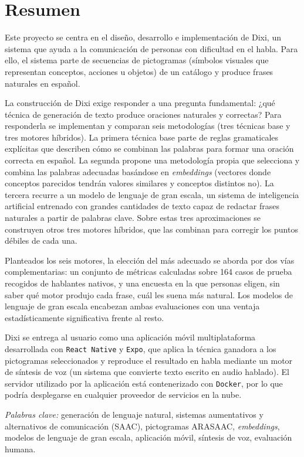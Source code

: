 \newpage{\ }
\thispagestyle{empty}
\chapter*{Resumen}

\noindent Este proyecto se centra en el diseño, desarrollo e implementación de Dixi, un sistema que ayuda a la comunicación de personas con dificultad en el habla. Para ello, el sistema parte de secuencias de pictogramas (símbolos visuales que representan conceptos, acciones u objetos) de un catálogo y produce frases naturales en español.

La construcción de Dixi exige responder a una pregunta fundamental: ¿qué técnica de generación de texto produce oraciones naturales y correctas? Para responderla se implementan y comparan seis metodologías (tres técnicas base y tres motores híbridos). La primera técnica base parte de reglas gramaticales explícitas que describen cómo se combinan las palabras para formar una oración correcta en español. La segunda propone una metodología propia que selecciona y combina las palabras adecuadas basándose en \textit{embeddings} (vectores donde conceptos parecidos tendrán valores similares y conceptos distintos no). La tercera recurre a un modelo de lenguaje de gran escala, un sistema de inteligencia artificial entrenado con grandes cantidades de texto capaz de redactar frases naturales a partir de palabras clave. Sobre estas tres aproximaciones se construyen otros tres motores híbridos, que las combinan para corregir los puntos débiles de cada una.

Planteados los seis motores, la elección del más adecuado se aborda por dos vías complementarias: un conjunto de métricas calculadas sobre 164 casos de prueba recogidos de hablantes nativos, y una encuesta en la que personas eligen, sin saber qué motor produjo cada frase, cuál les suena más natural. Los modelos de lenguaje de gran escala encabezan ambas evaluaciones con una ventaja estadísticamente significativa frente al resto.

Dixi se entrega al usuario como una aplicación móvil multiplataforma desarrollada con \texttt{React Native} y \texttt{Expo}, que aplica la técnica ganadora a los pictogramas seleccionados y reproduce el resultado en habla mediante un motor de síntesis de voz (un sistema que convierte texto escrito en audio hablado). El servidor utilizado por la aplicación está contenerizado con \texttt{Docker}, por lo que podría desplegarse en cualquier proveedor de servicios en la nube.

\vspace{.5cm}

\noindent \textit{Palabras clave:} generación de lenguaje natural, sistemas aumentativos y alternativos de comunicación (SAAC), pictogramas ARASAAC, \textit{embeddings}, modelos de lenguaje de gran escala, aplicación móvil, síntesis de voz, evaluación humana.
